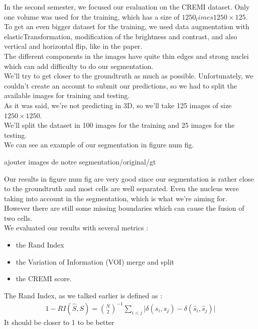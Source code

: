In the second semester, we focused our evaluation on the CREMI dataset. Only one volume was used for the training, which has a size of $1250_times 1250\times 125$.\\
To get an even bigger dataset for the training, we used data augmentation with elasticTransformation, modification of the brightness and contrast, and also vertical and horizontal flip, like in the paper.\\
The different components in the images have quite thin edges and strong nuclei which can add difficulty to do our segmentation.\\
We’ll try to get closer to the groundtruth as much as possible. Unfortunately, we couldn’t create an account to submit our predictions, so we had to split the available images for training and testing.\\ 
As it was said, we’re not predicting in 3D, so we’ll take 125 images of size $1250\times 1250$.\\ 
We’ll split the dataset in 100 images for the training and 25 images for the testing.\\
We can see an example of our segmentation in figure {\color{red} num fig}.

{\color{red} ajouter images de notre segmentation/original/gt}

Our results in figure {\color{red} num fig} are very good since our segmentation is rather close to the groundtruth and most cells are well separated.
Even the nucleus were taking into account in the segmentation, which is what we're aiming for.\\
However there are still some missing boundaries which can cause the fusion of two cells.\\

We evaluated our results with several metrics :\\
\begin{itemize}
  \item the Rand Index
  \item the Variation of Information (VOI) merge and split
  \item the CREMI score.
\end{itemize}

The Rand Index, as we talked earlier is defined as :\\
\begin{gather*}
	1 - RI(\hat{S},S) = \binom{N}{2}^{-1} \sum_{i<j} \lvert \delta(s_i,s_j) -
	\delta(\hat{s}_i,\hat{s}_j) \rvert
\end{gather*}
It should be closer to 1 to be better\\


